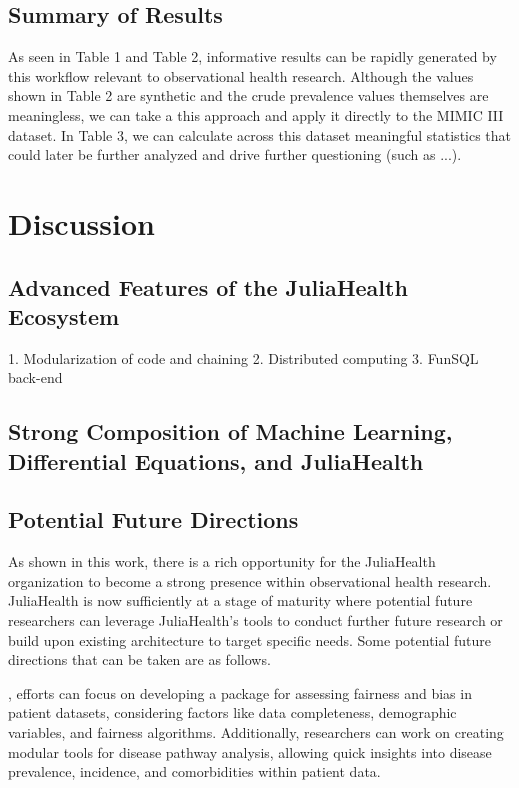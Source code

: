 \documentclass{juliacon}
\begin{document}
\subsection{Summary of Results}

As seen in Table 1 and Table 2, informative results can be rapidly generated by this workflow relevant to observational health research.
Although the values shown in Table 2 are synthetic and the crude prevalence values themselves are meaningless, we can take a this approach and apply it directly to the MIMIC III dataset.
In Table 3, we can calculate across this dataset meaningful statistics that could later be further analyzed and drive further questioning (such as ...).

\section{Discussion}

\subsection{Advanced Features of the JuliaHealth Ecosystem}

    1. Modularization of code and chaining
    2. Distributed computing
    3. FunSQL back-end

\subsection{Strong Composition of Machine Learning, Differential Equations, and JuliaHealth}

\subsection{Potential Future Directions}

As shown in this work, there is a rich opportunity for the JuliaHealth organization to become a strong presence within observational health research. 
JuliaHealth is now sufficiently at a stage of maturity where potential future researchers can leverage JuliaHealth's tools to conduct further future research or build upon existing architecture to target specific needs.
Some potential future directions that can be taken are as follows.

, efforts can focus on developing a package for assessing fairness and bias in patient datasets, considering factors like data completeness, demographic variables, and fairness algorithms. Additionally, researchers can work on creating modular tools for disease pathway analysis, allowing quick insights into disease prevalence, incidence, and comorbidities within patient data. 
\end{document}
